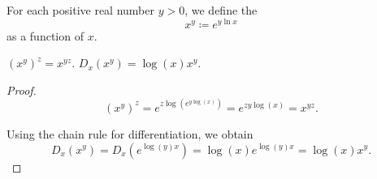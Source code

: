 \begin{definition}\label{def:power_function}
  For each positive real number \( y > 0 \), we define the 
  \begin{equation*}
    x^y \coloneqq e^{y \ln x}
  \end{equation*}
  as a function of \( x \).
\end{definition}

\begin{proposition}\label{thm:power_function_properties}
  \mbox{}
  \begin{PropEnum}
     \( (x^y)^z = x^{yz} \).
     \( D_x(x^y) = \log(x) x^y \).
  \end{PropEnum}
\end{proposition}
\begin{proof}
  \begin{equation*}
    (x^y)^z
    =
    e^{z \log(e^{y \log(x)})}
    =
    e^{z y \log(x)}
    =
    x^{yz}.
  \end{equation*}

   Using the chain rule for differentiation, we obtain
  \begin{equation*}
    D_x(x^y) = D_x(e^{\log(y) x}) = \log(x) e^{\log(y) x} = \log(x) x^y.
  \end{equation*}
\end{proof}
